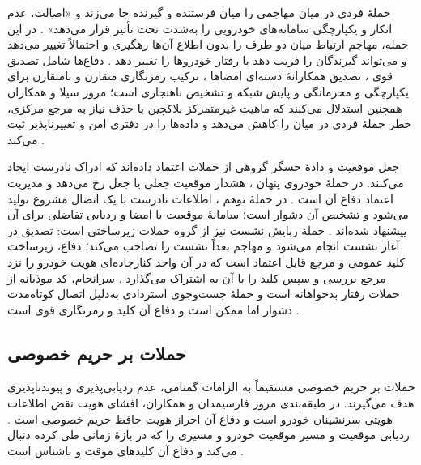 حملهٔ فردی در میان  مهاجمی را میان فرستنده و گیرنده جا می‌زند و «اصالت، عدم انکار و یکپارچگی سامانه‌های خودرویی را به‌شدت تحت تأثیر قرار می‌دهد» \cite{farsimadanReviewSecurityChallenges2025}. در این حمله، مهاجم ارتباط میان دو طرف را بدون اطلاع آن‌ها رهگیری و احتمالاً تغییر می‌دهد و می‌تواند گیرندگان را فریب دهد یا رفتار خودروها را تغییر دهد \cite{VanetSecurityPrivacy}. دفاع‌ها شامل تصدیق قوی \cite{farsimadanReviewSecurityChallenges2025}، تصدیق همکارانهٔ دسته‌ای امضاها \cite{farsimadanReviewSecurityChallenges2025}، ترکیب رمزنگاری متقارن و نامتقارن برای یکپارچگی و محرمانگی \cite{VanetSecurityPrivacy} و پایش شبکه و تشخیص ناهنجاری است؛ مرور سیلا و همکاران همچنین استدلال می‌کنند که ماهیت غیرمتمرکز بلاکچین با حذف نیاز به مرجع مرکزی، خطر حملهٔ فردی در میان را کاهش می‌دهد و داده‌ها را در دفتری امن و تغییرناپذیر ثبت می‌کند \cite{VanetSecurityPrivacy}.

جعل موقعیت و دادهٔ حسگر گروهی از حملات اعتماد داده‌اند که ادراک نادرست ایجاد می‌کنند. در حملهٔ خودروی پنهان ، هشدار موقعیت جعلی یا جعل  رخ می‌دهد و مدیریت اعتماد دفاع آن است \cite{farsimadanReviewSecurityChallenges2025}. در حملهٔ توهم ، اطلاعات نادرست با یک اتصال مشروع تولید می‌شود و تشخیص آن دشوار است؛ سامانهٔ موقعیت با امضا و ردیابی تفاضلی برای آن پیشنهاد شده‌اند \cite{farsimadanReviewSecurityChallenges2025}. حملهٔ ربایش نشست  نیز از گروه حملات زیرساختی است: تصدیق در آغاز نشست انجام می‌شود و مهاجم بعداً نشست را تصاحب می‌کند؛ دفاع، زیرساخت کلید عمومی و مرجع قابل اعتماد است که در آن واحد کنارجاده‌ای هویت خودرو را نزد مرجع بررسی و سپس کلید را با آن به اشتراک می‌گذارد \cite{farsimadanReviewSecurityChallenges2025}. سرانجام، کد موذیانه  از حملات رفتار بدخواهانه است \cite{farsimadanReviewSecurityChallenges2025} و حملهٔ جست‌وجوی استردادی  به‌دلیل اتصال کوتاه‌مدت دشوار اما ممکن است و دفاع آن کلید و رمزنگاری قوی است \cite{farsimadanReviewSecurityChallenges2025}.

\subsection{حملات بر حریم خصوصی}

حملات بر حریم خصوصی مستقیماً به الزامات گمنامی، عدم ردیابی‌پذیری و پیوندناپذیری هدف می‌گیرند. در طبقه‌بندی مرور فارسیمدان و همکاران، افشای هویت  نقض اطلاعات هویتی سرنشینان خودرو است و دفاع آن احراز هویت حافظ حریم خصوصی است \cite{farsimadanReviewSecurityChallenges2025}. ردیابی موقعیت و مسیر  موقعیت خودرو و مسیری را که در بازهٔ زمانی طی کرده دنبال می‌کند و دفاع آن کلیدهای موقت و ناشناس است \cite{farsimadanReviewSecurityChallenges2025}.

